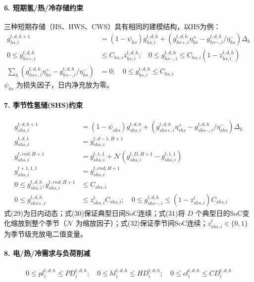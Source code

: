 \documentclass[11pt]{ctexart}
\begin{document}
\paragraph{6. 短期氢/热/冷存储约束}
三种短期存储（HS、HWS、CWS）具有相同的建模结构，以HS为例：
\begin{align}
    g_{hs,i}^{t,d,h+1} &= (1 - \psi_{hs}) g_{hs,i}^{t,d,h} + (g_{hs+,i}^{t,d,h} \eta_{hs}^+ - g_{hs-,i}^{t,d,h} / \eta_{hs}^-) \Delta_h \\
    0 \le g_{hs+,i}^{t,d,h} &\le C_{hs,i} z_{hs,i}^{t,d,h}; \quad 0 \le g_{hs-,i}^{t,d,h} \le C_{hs,i} (1 - z_{hs,i}^{t,d,h}) \\
    \sum_{h} (g_{hs+,i}^{t,d,h} \eta_{hs}^+ - g_{hs-,i}^{t,d,h} / \eta_{hs}^-) &= 0; \quad 0 \le g_{hs,i}^{t,d,h} \le C_{hs,i}
\end{align}
$\psi_{hs}$ 为损失因子，日内净充放为零。

\paragraph{7. 季节性氢储(SHS)约束}
\begin{align}
    g_{shs,i}^{t,d,h+1} &= (1 - \psi_{shs}) g_{shs,i}^{t,d,h} + (g_{shs+,i}^{t,d,h} \eta_{shs}^+ - g_{shs-,i}^{t,d,h} / \eta_{shs}^-) \Delta_h \\
    g_{shs,i}^{t,d,1} &= g_{shs,i}^{t,d-1,H+1} \\
    g_{shs,i}^{t,end,H+1} &= g_{shs,i}^{t,1,1} + \mathcal{N}(g_{shs,i}^{t,D,H+1} - g_{shs,i}^{t,1,1}) \\
    g_{shs,i}^{t+1,1,1} &= g_{shs,i}^{t,end,H+1} \\
    0 \le g_{shs,i}^{t,d,h}, g_{shs,i}^{t,end,H+1} &\le C_{shs,i} \\
    0 \le g_{shs+,i}^{t,d,h} &\le z_{shs,i}^t C_{shs,i}; \quad 0 \le g_{shs-,i}^{t,d,h} \le (1 - z_{shs,i}^t) C_{shs,i}
\end{align}
式(29)为日内动态；式(30)保证典型日间SoC连续；式(31)将 $D$ 个典型日的SoC变化缩放到整个季节（$\mathcal{N}$ 为缩放因子）；式(32)保证季节间SoC连续；$z_{shs,i}^t \in \{0,1\}$ 为季节级充放电二值变量。

\paragraph{8. 电/热/冷需求与负荷削减}
\begin{align}
    0 \le pl_i^{t,d,h} \le PD_i^{t,d,h}; \quad 0 \le hl_i^{t,d,h} \le HD_i^{t,d,h}; \quad 0 \le cl_i^{t,d,h} \le CD_i^{t,d,h}
\end{align}
\end{document}
